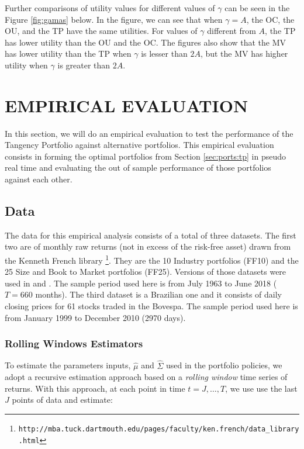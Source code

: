 \documentclass[12pt,oneside,a4paper]{memoir}
\begin{document}
Further comparisons of utility values for different values of $\gamma$ can be seen in the Figure \ref{fig:gamas} below.
In the figure, we can see that when $\gamma=A$, the OC, the OU, and the TP have the same utilities. For values of $\gamma$ different from $A$, the TP has lower utility than the OU and the OC. The figures also show that the MV has lower utility than the TP when $\gamma$ is lesser than $2A$, but the MV has higher utility when $\gamma$ is greater than $2A$.

\section{EMPIRICAL EVALUATION} \label{sec:experiment:tp}
In this section, we will do an empirical evaluation to test the performance of the Tangency Portfolio against alternative portfolios.
This empirical evaluation consists in forming the optimal portfolios from Section \ref{sec:ports:tp} in pseudo real time and evaluating the out of sample performance of those portfolios against each other.

\subsection{Data}
The data for this empirical analysis consists of a total of three datasets.
The first two are of monthly raw returns (not in excess of the risk-free asset) drawn from the Kenneth French library
\footnote[1]{\texttt{http://mba.tuck.dartmouth.edu/pages/faculty/ken.french/data\_library.html}}.
They are the 10 Industry portfolios (FF10) and the 25 Size and Book to Market portfolios (FF25).
Versions of those datasets were used in  and .
The sample period used here is from July 1963 to June 2018 ($T=660$ months).
The third dataset is a Brazilian one and it consists of daily closing prices for 61 stocks traded in the Bovespa.
The sample period used here is from January 1999 to December 2010 (2970 days).

\subsubsection*{Rolling Windows Estimators}
To estimate the parameters inputs, $\hat{\mu}$ and $\hat{\Sigma}$ used in the portfolio policies, we adopt a recursive estimation approach based on a \textit{rolling window} time series of returns.
With this approach, at each point in time $t=J, \dots, T$, we use use the last $J$ points of data and estimate:
\end{document}
